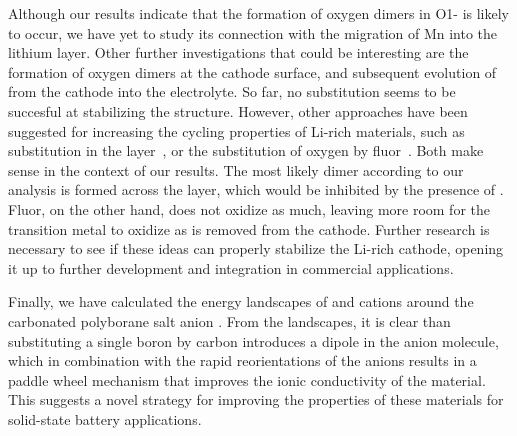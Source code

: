 \begin{refsection}
Although our results indicate that the formation of oxygen dimers in 
O1- is likely to occur, we have yet to study its connection 
with the migration of Mn into the lithium layer. Other further investigations 
that could be interesting are the formation of oxygen dimers at the cathode 
surface, and subsequent evolution of  from the cathode into the 
electrolyte. So far, no substitution seems to be succesful at stabilizing 
the structure. However, other approaches have been suggested for 
increasing the cycling properties of Li-rich materials, such as  
substitution in the  layer~\cite{Yang2017}, or the substitution of 
oxygen by fluor~\cite{Richards2017, Kapylou2017}. Both make sense in the context of 
our results. The most likely dimer according to our analysis is formed 
across the  layer, which would be inhibited by the presence of . 
Fluor, on the other hand, does not oxidize  as much, leaving more 
room for the transition metal to oxidize as  is removed from the 
cathode. Further research is necessary to see if these ideas can properly 
stabilize the Li-rich cathode, opening it up to further development and 
integration in commercial applications.

Finally, we have calculated the energy landscapes of  and  
cations around the carbonated polyborane salt anion \ce{[CB11H12]^{-}}. From 
the landscapes, it is clear than substituting a single boron by carbon introduces 
a dipole in the anion molecule, which in combination with the rapid reorientations 
of the anions results in a paddle wheel mechanism that improves the ionic 
conductivity of the material. This suggests a novel strategy for improving 
the properties of these materials for solid-state battery applications.
 
\clearpage
\pagestyle{biblio}
\printbibliography 

\end{refsection} 
